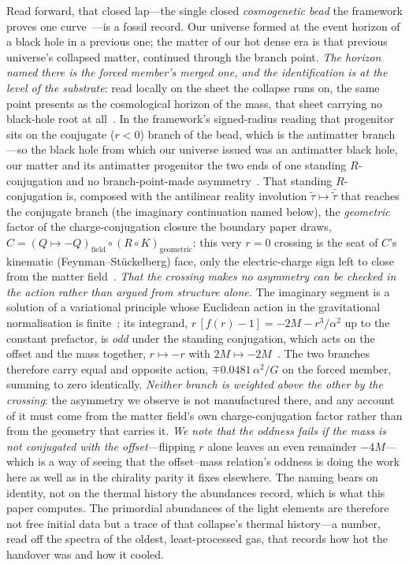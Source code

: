 \documentclass[11pt,a4paper]{article}
\theoremstyle{plain}
\theoremstyle{definition}
\theoremstyle{remark}
\begin{document}
Read forward, that closed lap---the single closed \emph{cosmogenetic bead} the framework proves one curve~\cite{JanzenCRframework}---is a fossil record. Our
universe formed at the event horizon of a black hole in a previous one; the matter of our hot
dense era is that previous universe's collapsed matter, continued through the branch point.
\emph{The horizon named there is the forced member's merged one, and the identification is at the
level of the substrate}: read locally on the sheet the collapse runs on, the same point presents as
the cosmological horizon of the mass, that sheet carrying no black-hole root at
all~\cite{JanzenCRframework}. In the
framework's signed-radius reading that progenitor sits on the conjugate ($r<0$) branch of the
bead, which is the antimatter branch---so the black hole from which our universe issued was an
antimatter black hole, our matter and its antimatter progenitor the two ends of one standing $R$-conjugation and no
branch-point-made asymmetry~\cite{JanzenCRframework,JanzenMatter}. That standing $R$-conjugation is, composed with the
antilinear reality involution $\tilde\tau\mapsto\bar{\tilde\tau}$ that reaches the conjugate branch (the imaginary
continuation named below), the \emph{geometric} factor of the charge-conjugation closure the boundary paper draws,
$C=(Q\mapsto-Q)_{\mathrm{field}}\circ(R\circ K)_{\mathrm{geometric}}$: this very $r=0$ crossing is the seat of $C$'s
kinematic (Feynman--St\"uckelberg) face, only the electric-charge sign left to close from the matter
field~\cite{JanzenBoundary}. \emph{That the crossing makes no asymmetry can be checked in the action rather than argued from
structure alone.} The imaginary segment is a solution of a variational principle whose Euclidean action in the
gravitational normalisation is finite~\cite{JanzenCanonicalTime}; its integrand, $r\,[f(r)-1]=-2M-r^{3}/\alpha^{2}$
up to the constant prefactor, is \emph{odd} under the standing conjugation, which acts on the offset and the
mass together, $r\mapsto-r$ with $2M\mapsto-2M$~\cite{JanzenMatter}. The two branches therefore carry equal and
opposite action, $\mp0.0481\,\alpha^{2}/G$ on the forced member, summing to zero
identically. \emph{Neither branch is weighted above the other by the
crossing}: the asymmetry we observe is not manufactured there, and any account of it must come from the matter
field's own charge-conjugation factor rather than from the geometry that carries it. \emph{We note that the
oddness fails if the mass is not conjugated with the offset}---flipping $r$ alone leaves an even remainder
$-4M$---which is a way of seeing that the offset--mass relation's oddness is doing the work here as well as in
the chirality parity it fixes elsewhere. The naming bears on identity, not on
the thermal history the abundances record, which is what this paper computes.
The primordial abundances of the light elements are therefore not free initial data but a trace of
that collapse's thermal history---a number, read off the spectra of the oldest, least-processed
gas, that records how hot the handover was and how it cooled.
\end{document}

